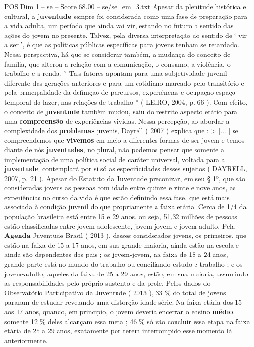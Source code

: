 \begin{textsample}{POS Dim 1 – se – Score 68.00 – se/se\_em\_3.txt}
Apesar da plenitude histórica e cultural, a \textbf{juventude} sempre foi considerada como uma fase de preparação para a vida adulta, um período que ainda vai vir, estando no futuro o sentido das ações do jovem no presente.
Talvez, pela diversa interpretação do sentido de ‘ vir a ser ’, é que as políticas públicas específicas para jovens tenham se retardado.
Nessa perspectiva, há que se considerar também, a mudança do conceito de família, que alterou a relação com a comunicação, o consumo, a violência, o trabalho e a renda. “ Tais fatores apontam para uma subjetividade juvenil diferente das gerações anteriores e para um cotidiano marcado pelo transitório e pela principalidade da definição de percursos, experiências e ocupação espaço-temporal do lazer, nas relações de trabalho ” ( LEIRO, 2004, p. 66 ).
Com efeito, o conceito de \textbf{juventude} também mudou, saiu do restrito aspecto etário para uma \textbf{compreensão} de experiências vividas.
Nessa percepção, ao abordar a complexidade dos \textbf{problemas} juvenis, Dayrell ( 2007 ) explica que : > [... ] se compreendemos que \textbf{vivemos} em meio a diferentes formas de ser jovem e temos diante de nós \textbf{juventudes}, no plural, não podemos pensar que somente a implementação de uma política social de caráter universal, voltada para a \textbf{juventude}, contemplará por si só as especificidades desses sujeitos ( DAYRELL, 2007, p. 21 ).
Apesar do Estatuto da Juventude preconizar, em seu § 1º, que são consideradas jovens as pessoas com idade entre quinze e vinte e nove anos, as experiências no curso da vida é que estão definindo essa fase, que está mais associada à condição juvenil do que propriamente a faixa etária.
Cerca de 1/4 da população brasileira está entre 15 e 29 anos, ou seja, 51,32 milhões de pessoas estão classificadas entre jovem-adolescente, jovem-jovem e jovem-adulto.
Pela \textbf{Agenda} Juventude Brasil ( 2013 ), desses considerados jovens, os primeiros, que estão na faixa de 15 a 17 anos, em sua grande maioria, ainda estão na escola e ainda são dependentes dos pais ; os jovem-jovem, na faixa de 18 a 24 anos, grande parte está no mundo do trabalho ou conciliando estudo e trabalho ; e os jovem-adulto, aqueles da faixa de 25 a 29 anos, estão, em sua maioria, assumindo as responsabilidades pelo próprio sustento e da prole.
Pelos dados do Observatório Participativo da Juventude ( 2013 ), 33 \% do total de jovens pararam de estudar revelando uma distorção idade-série.
Na faixa etária dos 15 aos 17 anos, quando, em princípio, o jovem deveria encerrar o ensino \textbf{médio}, somente 12 \% deles alcançam essa meta ; 46 \% só vão concluir essa etapa na faixa etária de 25 a 29 anos, exatamente por terem interrompido esse momento lá anteriormente.

\end{textsample}
